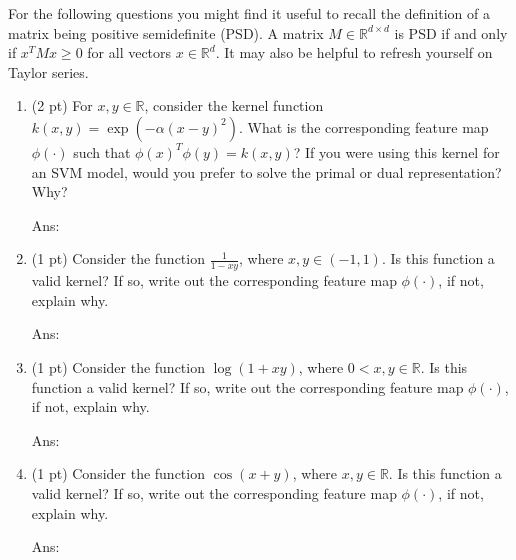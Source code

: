 \documentclass[10pt,letter,notitlepage]{article}
\newcommand{\ans}[1]{{\color{orange}\textsf{Ans}: #1}}
\newcounter{exercise}
\begin{document}
\begin{exercise}
      For the following questions you might find it useful to recall the definition of a matrix being positive semidefinite (PSD).
      A matrix $M \in \mathbb{R}^{d \times d}$ is PSD if and only if $x^T Mx \geq 0$ for all vectors $x \in \mathbb{R}^d$.
      It may also be helpful to refresh yourself on Taylor series.

  \begin{enumerate}
    \item (2 pt) For $x, y \in \mathbb{R}$, consider the kernel function $k(x, y) = \exp\left(-\alpha\left(x - y\right)^2\right)$.
      What is the corresponding feature map $\phi(\cdot)$ such that $\phi(x)^T \phi(y) = k(x, y)$?
      If you were using this kernel for an SVM model, would you prefer to solve the primal or dual representation? Why?

\ans{}


    \item (1 pt) Consider the function $\frac{1}{1 - xy}$, where $x, y \in (-1, 1)$.
      Is this function a valid kernel?
      If so, write out the corresponding feature map $\phi(\cdot)$, if not, explain why.

\ans{}
    \item (1 pt) Consider the function $\log (1 + xy)$, where $0 < x, y \in \mathbb{R}$.
      Is this function a valid kernel?
      If so, write out the corresponding feature map $\phi(\cdot)$, if not, explain why.

\ans{}
    \item (1 pt) Consider the function $\cos(x + y)$, where $x, y \in \mathbb{R}$.
      Is this function a valid kernel?
      If so, write out the corresponding feature map $\phi(\cdot)$, if not, explain why.

\ans{}
  \end{enumerate}
\end{exercise}
\end{document}
